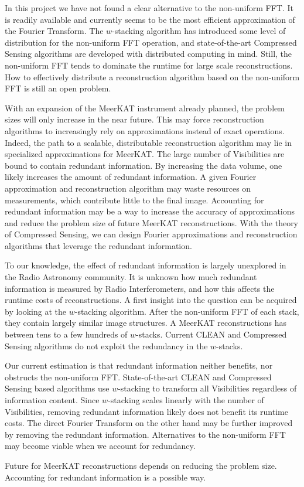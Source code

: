 In this project we have not found a clear alternative to the non-uniform FFT. It is readily available and currently seems to be the most efficient approximation of the Fourier Transform. The $w$-stacking algorithm\cite{offringa2014wsclean} has introduced some level of distribution for the non-uniform FFT operation, and state-of-the-art Compressed Sensing algorithms\cite{dabbech2018cygnus, pratley2018fast} are developed with distributed computing in mind. Still, the non-uniform FFT tends to dominate the runtime for large scale reconstructions. How to effectively distribute a reconstruction algorithm based on the non-uniform FFT is still an open problem.

With an expansion of the MeerKAT instrument already planned, the problem sizes will only increase in the near future. This may force reconstruction algorithms to increasingly rely on approximations instead of exact operations. Indeed, the path to a scalable, distributable reconstruction algorithm may lie in specialized approximations for MeerKAT. The large number of Visibilities are bound to contain redundant information. By increasing the data volume, one likely increases the amount of redundant information. A given Fourier approximation and reconstruction algorithm may waste resources on measurements, which contribute little to the final image. Accounting for redundant information may be a way to increase the accuracy of approximations and reduce the problem size of future MeerKAT reconstructions. With the theory of Compressed Sensing, we can design Fourier approximations and reconstruction algorithms that leverage the redundant information.

To our knowledge, the effect of redundant information is largely unexplored in the Radio Astronomy community. It is unknown how much redundant information is measured by Radio Interferometers, and how this affects the runtime costs of reconstructions. A first insight into the question can be acquired by looking at the $w$-stacking algorithm. After the non-uniform FFT of each stack, they contain largely similar image structures. A MeerKAT reconstructions has between tens to a few hundreds of $w$-stacks. Current CLEAN and Compressed Sensing algorithms do not exploit the redundancy in the $w$-stacks. 

Our current estimation is that redundant information neither benefits, nor obstructs the non-uniform FFT. State-of-the-art CLEAN and Compressed Sensing based algorithms use $w$-stacking to transform all Visibilities regardless of information content. Since $w$-stacking scales linearly with the number of Visibilities, removing redundant information likely does not benefit its runtime costs. The direct Fourier Transform on the other hand may be further improved by removing the redundant information. Alternatives to the non-uniform FFT may become viable when we account for redundancy.

Future for MeerKAT reconstructions depends on reducing the problem size. Accounting for redundant information is a possible way.















